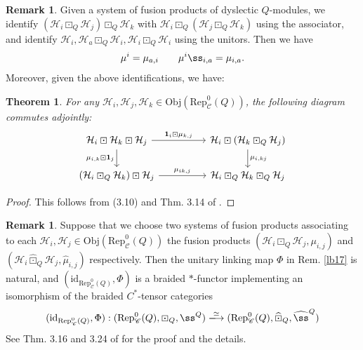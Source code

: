 \documentclass[11pt,b5paper,notitlepage]{article}
\theoremstyle{definition}
\newtheorem{rem}[df]{Remark}
\theoremstyle{plain}
\newtheorem{thm}[df]{Theorem}
\newcommand{\mc}{\mathcal}
\newcommand{\wht}{\widehat}
\newcommand{\idt}{\mathbf{1}}
\newcommand{\id}{\mathrm{id}}
\newcommand{\Rep}{\mathrm{Rep}}
\newcommand{\scr}{\mathscr}
\newcommand{\Obj}{\mathrm{Obj}}
\numberwithin{equation}{section}
\begin{document}
\begin{rem}\label{lb28}
Given a system of fusion products of dyslectic $Q$-modules, we identify $(\mc H_i\boxdot_Q\mc H_j)\boxdot_Q\mc H_k$ with $\mc H_i\boxdot_Q(\mc H_j\boxdot_Q\mc H_k)$ using the associator, and identify $\mc H_i,\mc H_a\boxdot_Q\mc H_i,\mc H_i\boxdot_Q\mc H_i$ using the unitors. Then we have
\begin{align}
\mu^i=\mu_{a,i}\qquad \mu^i\ss_{i,a}=\mu_{i,a}.
\end{align}
Moreover, given the above identifications, we have:
\end{rem}

\begin{thm}\label{lb30}
For any $\mc H_i,\mc H_j,\mc H_k\in\Obj(\Rep_{\scr C}^0(Q))$, the following diagram commutes adjointly:
\begin{equation}\label{eq58}
\begin{tikzcd}[column sep=huge]
\mc H_i\boxdot\mc H_k\boxdot\mc H_j \arrow[r,"{\idt_i\boxdot\mu_{k,j}}"] \arrow[d, "{\mu_{i,k}\boxdot\idt_j}"'] &\mc H_i\boxdot(\mc H_k\boxdot_Q\mc H_j)\arrow[d, "{\mu_{i,kj}}"]\\
(\mc H_i\boxdot_Q\mc H_k)\boxdot\mc H_j\arrow[r,"{\mu_{ik,j}}"] &\mc H_i\boxdot_Q\mc H_k\boxdot_Q\mc H_j
	\end{tikzcd}
\end{equation}
\end{thm}

\begin{proof}
This follows from (3.10) and Thm. 3.14 of \cite{Gui22}.
\end{proof}


\begin{rem}\label{lb39}
Suppose that we choose two systems of fusion products associating to each $\mc H_i,\mc H_j\in\Obj(\Rep_{\scr C}^0(Q))$ the fusion products $(\mc H_i\boxdot_Q\mc H_j,\mu_{i,j})$ and $(\mc H_i\wht\boxdot_Q\mc H_j,\wht\mu_{i,j})$ respectively. Then the unitary linking map $\Phi$ in Rem. \ref{lb17} is natural, and $(\id_{\Rep_{\scr C}^0(Q)},\Phi)$ is a braided $*$-functor implementing an isomorphism of the braided $C^*$-tensor categories 
\begin{align}
(\id_{\Rep_{\scr C}^0(Q)},\Phi):(\Rep^0_{\scr C}(Q),\boxdot_Q,\ss^Q)\xlongrightarrow{\simeq}(\Rep^0_{\scr C}(Q),\wht\boxdot_Q,\wht\ss^Q)
\end{align}
See Thm. 3.16 and 3.24 of \cite{Gui22} for the proof and the details.
\end{rem}
\end{document}
